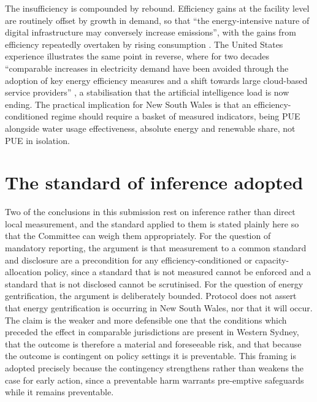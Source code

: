 The insufficiency is compounded by rebound. Efficiency gains at the facility level are routinely offset by growth in demand, so that \enquote{the energy-intensive nature of digital infrastructure may conversely increase emissions}, with the gains from efficiency repeatedly overtaken by rising consumption \autocite{liuImpactGlobalDigital2025}. The United States experience illustrates the same point in reverse, where for two decades \enquote{comparable increases in electricity demand have been avoided through the adoption of key energy efficiency measures and a shift towards large cloud-based service providers} \autocite{shehabiDataCenterGrowth2018a}, a stabilisation that the artificial intelligence load is now ending. The practical implication for New South Wales is that an efficiency-conditioned regime should require a basket of measured indicators, being PUE alongside water usage effectiveness, absolute energy and renewable share, not PUE in isolation.

\section{The standard of inference adopted}
\label{sec:supp:inference}

Two of the conclusions in this submission rest on inference rather than direct local measurement, and the standard applied to them is stated plainly here so that the Committee can weigh them appropriately. For the question of mandatory reporting, the argument is that measurement to a common standard and disclosure are a precondition for any efficiency-conditioned or capacity-allocation policy, since a standard that is not measured cannot be enforced and a standard that is not disclosed cannot be scrutinised. For the question of energy gentrification, the argument is deliberately bounded. Protocol does not assert that energy gentrification is occurring in New South Wales, nor that it will occur. The claim is the weaker and more defensible one that the conditions which preceded the effect in comparable jurisdictions are present in Western Sydney, that the outcome is therefore a material and foreseeable risk, and that because the outcome is contingent on policy settings it is preventable. This framing is adopted precisely because the contingency strengthens rather than weakens the case for early action, since a preventable harm warrants pre-emptive safeguards while it remains preventable.
